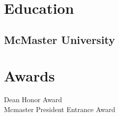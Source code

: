 \documentclass[]{farzad-resume}
\begin{document}
%
%
{\tiny }


%
%

\begin{minipage}[t]{\textwidth}


\begin{minipage}[t]{0.33\textwidth}
\section{Education}
\subsection{McMaster University}
\end{minipage}
\hfill
\begin{minipage}[t]{0.66\textwidth}
\section{Awards}

Dean Honor Award \\
Mcmaster President Entrance Award \\
\end{minipage}
\hfill
 \end{minipage}
\end{document}
